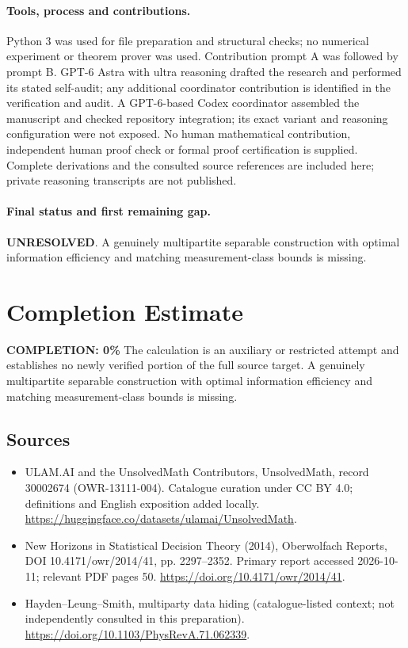 \documentclass[11pt]{article}
\begin{document}
\paragraph{Tools, process and contributions.}
Python 3 was used for file preparation and structural checks; no numerical experiment or theorem prover was used. Contribution prompt A was followed by prompt B. GPT-6 Astra with ultra reasoning drafted the research and performed its stated self-audit; any additional coordinator contribution is identified in the verification and audit. A GPT-6-based Codex coordinator assembled the manuscript and checked repository integration; its exact variant and reasoning configuration were not exposed. No human mathematical contribution, independent human proof check or formal proof certification is supplied. Complete derivations and the consulted source references are included here; private reasoning transcripts are not published.

\paragraph{Final status and first remaining gap.}
\textbf{UNRESOLVED}. A genuinely multipartite separable construction with optimal information efficiency and matching measurement-class bounds is missing.

\section{Completion Estimate}
\noindent\textbf{COMPLETION: 0\%}
The calculation is an auxiliary or restricted attempt and establishes no newly verified portion of the full source target. A genuinely multipartite separable construction with optimal information efficiency and matching measurement-class bounds is missing.

\subsection{Sources}
\begin{itemize}
\item[\hypertarget{source:30002674:1}{S1}] ULAM.AI and the UnsolvedMath Contributors, UnsolvedMath, record 30002674 (OWR-13111-004). Catalogue curation under CC BY 4.0; definitions and English exposition added locally.
\url{https://huggingface.co/datasets/ulamai/UnsolvedMath}.
\item[\hypertarget{source:30002674:2}{S2}] New Horizons in Statistical Decision Theory (2014), Oberwolfach Reports, DOI 10.4171/owr/2014/41, pp. 2297--2352. Primary report accessed 2026-10-11; relevant PDF pages 50.
\url{https://doi.org/10.4171/owr/2014/41}.
\item[\hypertarget{source:30002674:3}{S3}] Hayden--Leung--Smith, multiparty data hiding (catalogue-listed context; not independently consulted in this preparation).
\url{https://doi.org/10.1103/PhysRevA.71.062339}.
\end{itemize}
\label{end:30002674}
\end{document}

